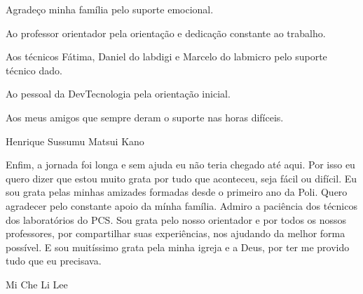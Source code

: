 \begin{agradecimentos}
\vspace{10mm}
Agradeço minha família pelo suporte emocional.

Ao professor orientador pela orientação e dedicação constante ao trabalho.

Aos técnicos Fátima, Daniel do labdigi e Marcelo do labmicro pelo suporte técnico dado.

Ao pessoal da DevTecnologia pela orientação inicial.

Aos meus amigos que sempre deram o suporte nas horas difíceis.

\vspace{10mm}
Henrique Sussumu Matsui Kano 
\vspace{40mm}

Enfim, a jornada foi longa e sem ajuda eu não teria chegado até aqui. Por isso eu quero dizer que estou muito grata por tudo que aconteceu, seja fácil ou difícil. Eu sou grata pelas minhas amizades formadas desde o primeiro ano da Poli. Quero agradecer pelo constante apoio da mínha família. Admiro a paciência dos técnicos dos laboratórios do PCS. Sou grata pelo nosso orientador e por todos os nossos professores, por compartilhar suas experiências, nos ajudando da melhor forma possível. E sou muitíssimo grata pela minha igreja e a Deus, por ter me provido tudo que eu precisava.

\vspace{10mm}
Mi Che Li Lee
\hfill
\end{agradecimentos}
